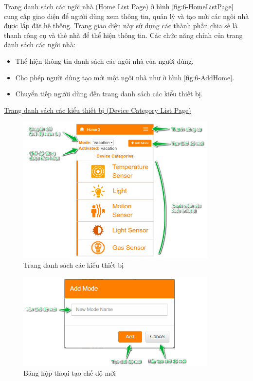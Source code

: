 \documentclass[12pt,a4paper,oneside]{extbook}
\begin{document}
Trang danh sách các ngôi nhà (Home List Page) ở hình \ref{fig:6-HomeListPage} cung cấp giao diện để người dùng xem thông tin, quản lý và tạo mới các ngôi nhà được lắp đặt hệ thống. Trang giao diện này sử dụng các thành phần chia sẻ là thanh công cụ và thẻ nhà để thể hiện thông tin. Các chức năng chính của trang danh sách các ngôi nhà:

\begin{itemize}[topsep=1mm,itemsep=-0.5mm]
\item Thể hiện thông tin danh sách các ngôi nhà của người dùng.
\item Cho phép người dùng tạo mới một ngôi nhà như ờ hình \ref{fig:6-AddHome}.
\item Chuyển tiếp người dùng đến trang danh sách các kiểu thiết bị.
\vspace{1mm}
\end{itemize}

\underline{Trang danh sách các kiểu thiết bị (Device Category List Page)}

\begin{figure}[h]
  \centering
     \includegraphics[width=10cm]{6-DeviceCategoryList}
  \caption{Trang danh sách các kiểu thiết bị}\label{fig:6-DeviceCategoryList}
\end{figure}

\begin{figure}[h]
  \centering
     \includegraphics[width=10cm]{6-AddMode}
  \caption{Bảng hộp thoại tạo chế độ mới}\label{fig:6-AddMode}
\end{figure}
\end{document}
